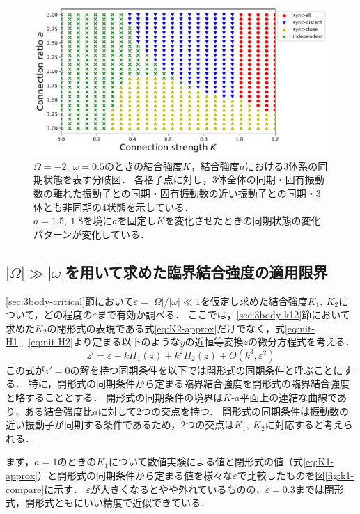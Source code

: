 \documentclass[../main]{subfiles}
\begin{document}
\begin{figure}[tbp]
\centering
\includegraphics[width=135mm]{./images/three-body-phase-boundary.pdf}
\centering
\caption{$\Omega=-2,\ \omega=0.5$のときの結合強度$K$，結合強度$a$における3体系の同期状態を表す分岐図．
各格子点に対し，3体全体の同期・固有振動数の離れた振動子との同期・固有振動数の近い振動子との同期・3体とも非同期の4状態を示している．\\
$a=1.5,\ 1.8$を境に$a$を固定し$K$を変化させたときの同期状態の変化パターンが変化している．}
\label{fig:3body-phase-boundary}
\end{figure}

\subsection{$|\Omega|\gg|\omega|$を用いて求めた臨界結合強度の適用限界}
\ref{sec:3body-critical}節において$\varepsilon=|\Omega|/|\omega|\ll 1$を仮定し求めた結合強度$K_1,\ K_2$について，どの程度の$\varepsilon$まで有効か調べる．
ここでは，\ref{sec:3body-k12}節において求めた$K_2$の閉形式の表現である式\eqref{eq:K2-approx}だけでなく，式\eqref{eq:nit-H1},\ \eqref{eq:nit-H2}より定まる以下のような$y$の近恒等変換$z$の微分方程式を考える．
\begin{equation}
    \label{eq:k1k2-open}
    z'=\varepsilon+kH_1(z)+k^2H_2(z)+O(k^3,\varepsilon^2)
\end{equation}
この式が$z'=0$の解を持つ同期条件を以下では開形式の同期条件と呼ぶことにする．
特に，開形式の同期条件から定まる臨界結合強度を開形式の臨界結合強度と略することとする．
開形式の同期条件の境界は$K$-$a$平面上の連結な曲線であり，ある結合強度比$a$に対して2つの交点を持つ．
開形式の同期条件は振動数の近い振動子が同期する条件であるため，2つの交点は$K_1,\ K_2$に対応すると考えられる．

まず，$a=1$のときの$K_1$について数値実験による値と閉形式の値（式\eqref{eq:K1-approx}）と開形式の同期条件から定まる値を様々な$\varepsilon$で比較したものを図\ref{fig:k1-compare}に示す．
$\varepsilon$が大きくなるとやや外れているものの，$\varepsilon=0.3$までは閉形式，開形式ともにいい精度で近似できている．
\end{document}
